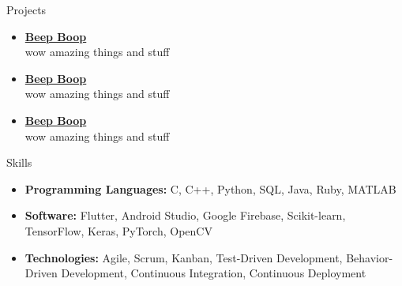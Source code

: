 \documentclass[]{../mcdowellcv}
\begin{document}
\begin{cvsection}{Projects}

    \begin{cvsubsection}{}{}{}
        \begin{itemize}
            \setlength\itemsep{3pt}
            \item\textbf{\href{https://github.com/johndoe/beepboop}{Beep Boop}} \\
            wow amazing things and stuff
        \end{itemize}
    \end{cvsubsection}
    
    \begin{cvsubsection}{}{}{}
        \begin{itemize}
            \setlength\itemsep{3pt}
            \item\textbf{\href{https://github.com/johndoe/beepboop}{Beep Boop}} \\
            wow amazing things and stuff
        \end{itemize}
    \end{cvsubsection}
    
    \begin{cvsubsection}{}{}{}
        \begin{itemize}
            \setlength\itemsep{3pt}
            \item\textbf{\href{https://github.com/johndoe/beepboop}{Beep Boop}} \\
            wow amazing things and stuff
        \end{itemize}
    \end{cvsubsection}
    
\end{cvsection}

\begin{cvsection}{Skills}
    \begin{cvsubsection}{}{}{}
        \begin{itemize}
            \item \textbf{Programming Languages:} C, C++, Python, SQL, Java, Ruby, MATLAB
            \item \textbf{Software:} Flutter, Android Studio, Google Firebase, Scikit-learn, TensorFlow, Keras, PyTorch, OpenCV
            \item \textbf{Technologies:} Agile, Scrum, Kanban, Test-Driven Development, Behavior-Driven Development, Continuous Integration, Continuous Deployment
        \end{itemize}
    \end{cvsubsection}
\end{cvsection}
\end{document}
